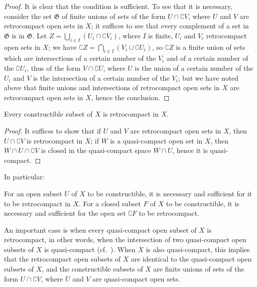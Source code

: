 \begin{proof}
It is clear that the condition is sufficient.
To see that it is necessary, consider the set $\mathfrak{G}$ of finite unions of sets of the form $U\cap\complement{V}$, where $U$ and $V$ are retrocompact open sets in $X$; it suffices to see that every complement of a set in $\mathfrak{G}$ is in $\mathfrak{G}$.
Let $Z=\bigcup_{i\in I}(U_i\cap\complement{V_i})$, where $I$ is finite, $U_i$ and $V_i$ retrocompact open sets in $X$; we have
$\complement{Z}=\bigcap_{i\in I}(V_i\cup\complement{U_i})$, so $\complement{Z}$ is a finite union of sets which are intersections of a certain number of the $V_i$ and of a certain number of the $\complement{U_i}$, thus of the form
$V\cap\complement{U}$, where $U$ is the union of a certain number of the $U_i$ and $V$ is the intersection of a certain number of the $V_i$; but we have noted above that finite unions and intersections of retrocompact open sets in $X$ are retrocompact open sets in $X$, hence the conclusion.
\end{proof}

\begin{corollary}[9.1.4]
\label{0.9.1.4}
Every constructible subset of $X$ is retrocompact in $X$.
\end{corollary}

\begin{proof}
It suffices to show that if $U$ and $V$ are retrocompact open sets in $X$, then $U\cap\complement{V}$ is retrocompact in $X$; if $W$ is a quasi-compact open set in $X$, then $W\cap U\cap\complement{V}$ is closed in the quasi-compact space $W\cap U$, hence it is quasi-compact.
\end{proof}

In particular:
\begin{corollary}[9.1.5]
\label{0.9.1.5}
For an open subset $U$ of $X$ to be constructible, it is necessary and sufficient for it to be retrocompact in $X$.
For a closed subset $F$ of $X$ to be constructible, it is necessary and sufficient for the open set $\complement{F}$ to be retrocompact.
\end{corollary}

\begin{env}[9.1.6]
\label{0.9.1.6}
An important case is when every quasi-compact open subset of $X$ is retrocompact, in other words, when the intersection of two quasi-compact open subsets of $X$ is quasi-compact (cf.~).
When $X$ is also quasi-compact, this implies that the retrocompact open subsets of $X$ are identical to the quasi-compact open subsets of $X$, and the constructible subsets of $X$ are finite unions of sets of the form $U\cap\complement{V}$, where $U$ and $V$ are quasi-compact open sets.
\end{env}

